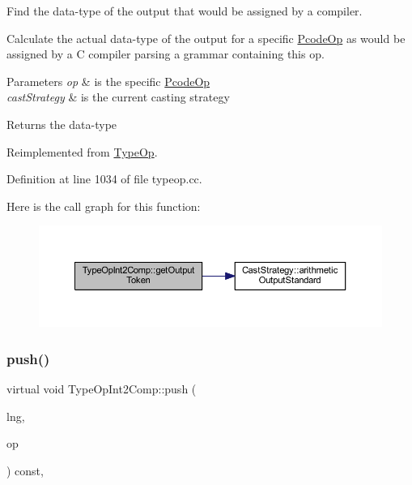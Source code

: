 Find the data-\/type of the output that would be assigned by a compiler. 

Calculate the actual data-\/type of the output for a specific \mbox{\hyperlink{class_pcode_op}{Pcode\+Op}} as would be assigned by a C compiler parsing a grammar containing this op. 
\begin{DoxyParams}{Parameters}
{\em op} & is the specific \mbox{\hyperlink{class_pcode_op}{Pcode\+Op}} \\
\hline
{\em cast\+Strategy} & is the current casting strategy \\
\hline
\end{DoxyParams}
\begin{DoxyReturn}{Returns}
the data-\/type 
\end{DoxyReturn}


Reimplemented from \mbox{\hyperlink{class_type_op_a7150ac93bb03a993735c829deb5237e7}{Type\+Op}}.



Definition at line 1034 of file typeop.\+cc.

Here is the call graph for this function\+:
\nopagebreak
\begin{figure}[H]
\begin{center}
\leavevmode
\includegraphics[width=350pt]{class_type_op_int2_comp_aa418bd590316df07485e1673c08b900f_cgraph}
\end{center}
\end{figure}
\mbox{\label{class_type_op_int2_comp_a4be303917727668a8290533e71352070}} 
\subsubsection{\texorpdfstring{push()}{push()}}
{\footnotesize\ttfamily virtual void Type\+Op\+Int2\+Comp\+::push (\begin{DoxyParamCaption}\item[{\mbox{\hyperlink{class_print_language}{Print\+Language}} $\ast$}]{lng,  }\item[{const \mbox{\hyperlink{class_pcode_op}{Pcode\+Op}} $\ast$}]{op }\end{DoxyParamCaption}) const\hspace{0.3cm}{\ttfamily [inline]}, {\ttfamily [virtual]}}



